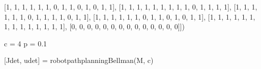 \documentclass[
]{article}
\newenvironment{Shaded}{\begin{snugshade}}{\end{snugshade}}
\newcommand{\DecValTok}[1]{\textcolor[rgb]{0.68,0.00,0.00}{#1}}
\newcommand{\FloatTok}[1]{\textcolor[rgb]{0.68,0.00,0.00}{#1}}
\newcommand{\NormalTok}[1]{\textcolor[rgb]{0.00,0.23,0.31}{#1}}
\newcommand{\OperatorTok}[1]{\textcolor[rgb]{0.37,0.37,0.37}{#1}}
\begin{document}
\begin{Shaded}
\begin{Highlighting}[]
\NormalTok{              [}\DecValTok{1}\NormalTok{, }\DecValTok{1}\NormalTok{, }\DecValTok{1}\NormalTok{, }\DecValTok{1}\NormalTok{, }\DecValTok{1}\NormalTok{, }\DecValTok{1}\NormalTok{, }\DecValTok{0}\NormalTok{, }\DecValTok{1}\NormalTok{, }\DecValTok{1}\NormalTok{, }\DecValTok{0}\NormalTok{, }\DecValTok{1}\NormalTok{, }\DecValTok{0}\NormalTok{, }\DecValTok{1}\NormalTok{, }\DecValTok{1}\NormalTok{],}
\NormalTok{              [}\DecValTok{1}\NormalTok{, }\DecValTok{1}\NormalTok{, }\DecValTok{1}\NormalTok{, }\DecValTok{1}\NormalTok{, }\DecValTok{1}\NormalTok{, }\DecValTok{1}\NormalTok{, }\DecValTok{1}\NormalTok{, }\DecValTok{1}\NormalTok{, }\DecValTok{1}\NormalTok{, }\DecValTok{0}\NormalTok{, }\DecValTok{1}\NormalTok{, }\DecValTok{1}\NormalTok{, }\DecValTok{1}\NormalTok{, }\DecValTok{1}\NormalTok{],}
\NormalTok{              [}\DecValTok{1}\NormalTok{, }\DecValTok{1}\NormalTok{, }\DecValTok{1}\NormalTok{, }\DecValTok{1}\NormalTok{, }\DecValTok{1}\NormalTok{, }\DecValTok{1}\NormalTok{, }\DecValTok{0}\NormalTok{, }\DecValTok{1}\NormalTok{, }\DecValTok{1}\NormalTok{, }\DecValTok{1}\NormalTok{, }\DecValTok{1}\NormalTok{, }\DecValTok{0}\NormalTok{, }\DecValTok{1}\NormalTok{, }\DecValTok{1}\NormalTok{],}
\NormalTok{              [}\DecValTok{1}\NormalTok{, }\DecValTok{1}\NormalTok{, }\DecValTok{1}\NormalTok{, }\DecValTok{1}\NormalTok{, }\DecValTok{1}\NormalTok{, }\DecValTok{1}\NormalTok{, }\DecValTok{0}\NormalTok{, }\DecValTok{1}\NormalTok{, }\DecValTok{1}\NormalTok{, }\DecValTok{0}\NormalTok{, }\DecValTok{1}\NormalTok{, }\DecValTok{0}\NormalTok{, }\DecValTok{1}\NormalTok{, }\DecValTok{1}\NormalTok{],}
\NormalTok{              [}\DecValTok{1}\NormalTok{, }\DecValTok{1}\NormalTok{, }\DecValTok{1}\NormalTok{, }\DecValTok{1}\NormalTok{, }\DecValTok{1}\NormalTok{, }\DecValTok{1}\NormalTok{, }\DecValTok{1}\NormalTok{, }\DecValTok{1}\NormalTok{, }\DecValTok{1}\NormalTok{, }\DecValTok{1}\NormalTok{, }\DecValTok{1}\NormalTok{, }\DecValTok{1}\NormalTok{, }\DecValTok{1}\NormalTok{, }\DecValTok{1}\NormalTok{],}
\NormalTok{              [}\DecValTok{0}\NormalTok{, }\DecValTok{0}\NormalTok{, }\DecValTok{0}\NormalTok{, }\DecValTok{0}\NormalTok{, }\DecValTok{0}\NormalTok{, }\DecValTok{0}\NormalTok{, }\DecValTok{0}\NormalTok{, }\DecValTok{0}\NormalTok{, }\DecValTok{0}\NormalTok{, }\DecValTok{0}\NormalTok{, }\DecValTok{0}\NormalTok{, }\DecValTok{0}\NormalTok{, }\DecValTok{0}\NormalTok{, }\DecValTok{0}\NormalTok{]])}

\NormalTok{c }\OperatorTok{=} \DecValTok{4}
\NormalTok{p }\OperatorTok{=} \FloatTok{0.1}

\NormalTok{[Jdet, udet] }\OperatorTok{=}\NormalTok{ robotpathplanningBellman(M, c)}
\end{Highlighting}
\end{Shaded}
\end{document}
